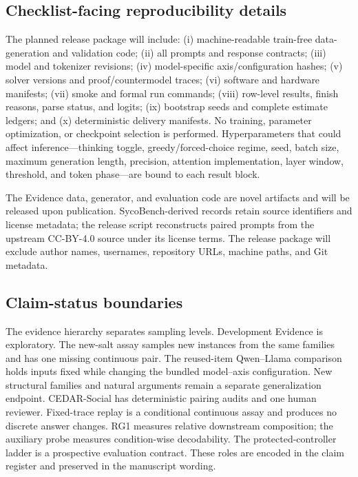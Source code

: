 \documentclass[letterpaper]{article}
\begin{document}
\subsection{Checklist-facing reproducibility details}

The planned release package will include: (i) machine-readable train-free data-generation and validation code; (ii) all prompts and response contracts; (iii) model and tokenizer revisions; (iv) model-specific axis/configuration hashes; (v) solver versions and proof/countermodel traces; (vi) software and hardware manifests; (vii) smoke and formal run commands; (viii) row-level results, finish reasons, parse status, and logits; (ix) bootstrap seeds and complete estimate ledgers; and (x) deterministic delivery manifests.  No training, parameter optimization, or checkpoint selection is performed.  Hyperparameters that could affect inference---thinking toggle, greedy/forced-choice regime, seed, batch size, maximum generation length, precision, attention implementation, layer window, threshold, and token phase---are bound to each result block.

The Evidence data, generator, and evaluation code are novel artifacts and will be released upon publication.  SycoBench-derived records retain source identifiers and license metadata; the release script reconstructs paired prompts from the upstream CC-BY-4.0 source under its license terms.  The release package will exclude author names, usernames, repository URLs, machine paths, and Git metadata.

\subsection{Claim-status boundaries}

The evidence hierarchy separates sampling levels.  Development Evidence is exploratory.  The new-salt assay samples new instances from the same families and has one missing continuous pair.  The reused-item Qwen--Llama comparison holds inputs fixed while changing the bundled model--axis configuration.  New structural families and natural arguments remain a separate generalization endpoint.  CEDAR-Social has deterministic pairing audits and one human reviewer.  Fixed-trace replay is a conditional continuous assay and produces no discrete answer changes.  RG1 measures relative downstream composition; the auxiliary probe measures condition-wise decodability.  The protected-controller ladder is a prospective evaluation contract.  These roles are encoded in the claim register and preserved in the manuscript wording.


\end{document}
